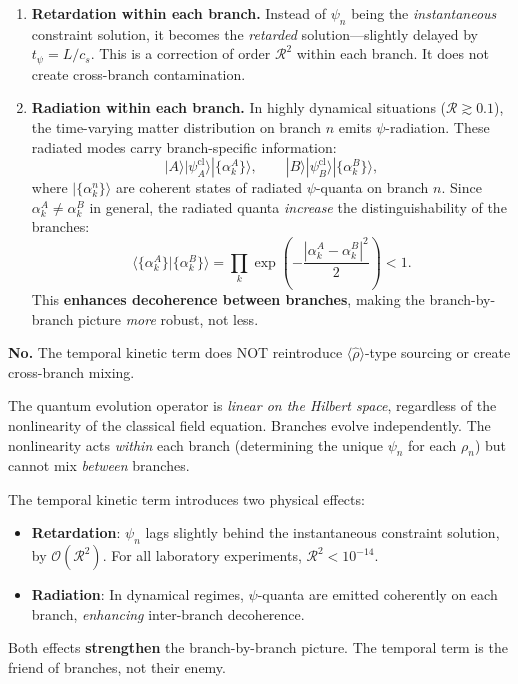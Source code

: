 \documentclass[12pt,a4paper]{article}
\newcommand{\order}[1]{\mathcal{O}(#1)}
\begin{document}
\begin{enumerate}
\item \textbf{Retardation within each branch.} Instead of $\psi_n$
being the \emph{instantaneous} constraint solution, it becomes the
\emph{retarded} solution---slightly delayed by $t_\psi = L/c_s$. This
is a correction of order $\mathcal{R}^2$ within each branch. It does
not create cross-branch contamination.

\item \textbf{Radiation within each branch.} In highly dynamical
situations ($\mathcal{R} \gtrsim 0.1$), the time-varying matter
distribution on branch $n$ emits $\psi$-radiation. These radiated modes
carry branch-specific information:
\begin{equation}
|A\rangle|\psi_A^\mathrm{cl}\rangle|\{\alpha_k^A\}\rangle, \qquad
|B\rangle|\psi_B^\mathrm{cl}\rangle|\{\alpha_k^B\}\rangle,
\end{equation}
where $|\{\alpha_k^n\}\rangle$ are coherent states of radiated
$\psi$-quanta on branch $n$. Since $\alpha_k^A \neq \alpha_k^B$ in
general, the radiated quanta \emph{increase} the distinguishability
of the branches:
\begin{equation}
\langle\{\alpha_k^A\}|\{\alpha_k^B\}\rangle
= \prod_k \exp\!\left(-\frac{|\alpha_k^A - \alpha_k^B|^2}{2}\right)
< 1.
\end{equation}
This \textbf{enhances decoherence between branches}, making the
branch-by-branch picture \emph{more} robust, not less.
\end{enumerate}

\begin{tcolorbox}[colback=red!5!white, colframe=dfdred,
title=Answer to Q4 --- The Definitive Result]
\textbf{No.} The temporal kinetic term does NOT reintroduce
$\langle\hat\rho\rangle$-type sourcing or create cross-branch mixing.

The quantum evolution operator is \emph{linear on the Hilbert space},
regardless of the nonlinearity of the classical field equation. Branches
evolve independently. The nonlinearity acts \emph{within} each branch
(determining the unique $\psi_n$ for each $\rho_n$) but cannot mix
\emph{between} branches.

The temporal kinetic term introduces two physical effects:
\begin{itemize}
\item \textbf{Retardation}: $\psi_n$ lags slightly behind the
instantaneous constraint solution, by $\order{\mathcal{R}^2}$.
For all laboratory experiments, $\mathcal{R}^2 < 10^{-14}$.
\item \textbf{Radiation}: In dynamical regimes, $\psi$-quanta are
emitted coherently on each branch, \emph{enhancing} inter-branch
decoherence.
\end{itemize}

Both effects \textbf{strengthen} the branch-by-branch picture.
The temporal term is the friend of branches, not their enemy.
\end{tcolorbox}
\end{document}
